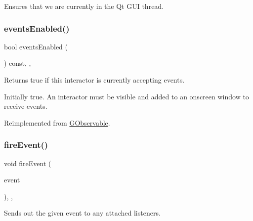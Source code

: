 Ensures that we are currently in the Qt G\+UI thread. 

\mbox{\label{classGInteractor_a597a370b592e3737d38d9d2f4e2031ea}} 
\subsubsection{\texorpdfstring{events\+Enabled()}{eventsEnabled()}}
{\footnotesize\ttfamily bool events\+Enabled (\begin{DoxyParamCaption}{ }\end{DoxyParamCaption}) const\hspace{0.3cm}{\ttfamily [override]}, {\ttfamily [virtual]}, {\ttfamily [inherited]}}



Returns true if this interactor is currently accepting events. 

Initially true. An interactor must be visible and added to an onscreen window to receive events. 

Reimplemented from \mbox{\hyperlink{classGObservable_a8ebb3da91032e7f4c34485dabc518b8a}{G\+Observable}}.

\mbox{\label{classGObservable_a63e5e5a6227c59c928493b11aceb0f67}} 
\subsubsection{\texorpdfstring{fire\+Event()}{fireEvent()}}
{\footnotesize\ttfamily void fire\+Event (\begin{DoxyParamCaption}\item[{\mbox{\hyperlink{classGEvent}{G\+Event}} \&}]{event }\end{DoxyParamCaption})\hspace{0.3cm}{\ttfamily [protected]}, {\ttfamily [virtual]}, {\ttfamily [inherited]}}



Sends out the given event to any attached listeners. 

\mbox{\label{classGObservable_ab3983ea07337b52020a29cc00c653d8d}} 
